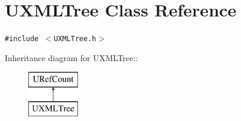 \hypertarget{class_u_x_m_l_tree}{
\section{UXMLTree Class Reference}
\label{class_u_x_m_l_tree}
}
{\tt \#include $<$UXMLTree.h$>$}

Inheritance diagram for UXMLTree::\begin{figure}[H]
\begin{center}
\leavevmode
\includegraphics[height=2cm]{class_u_x_m_l_tree}
\end{center}
\end{figure}
